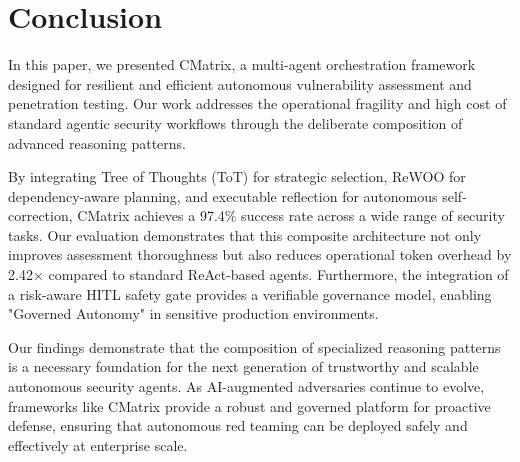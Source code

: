 \section{Conclusion}

In this paper, we presented CMatrix, a multi-agent orchestration framework designed for resilient and efficient autonomous vulnerability assessment and penetration testing. Our work addresses the operational fragility and high cost of standard agentic security workflows through the deliberate composition of advanced reasoning patterns. 

By integrating Tree of Thoughts (ToT) for strategic selection, ReWOO for dependency-aware planning, and executable reflection for autonomous self-correction, CMatrix achieves a 97.4\% success rate across a wide range of security tasks. Our evaluation demonstrates that this composite architecture not only improves assessment thoroughness but also reduces operational token overhead by 2.42$\times$ compared to standard ReAct-based agents. Furthermore, the integration of a risk-aware HITL safety gate provides a verifiable governance model, enabling "Governed Autonomy" in sensitive production environments.

Our findings demonstrate that the composition of specialized reasoning patterns is a necessary foundation for the next generation of trustworthy and scalable autonomous security agents. As AI-augmented adversaries continue to evolve, frameworks like CMatrix provide a robust and governed platform for proactive defense, ensuring that autonomous red teaming can be deployed safely and effectively at enterprise scale.
